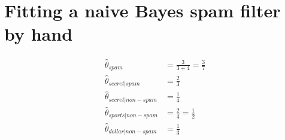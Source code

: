 \documentclass{article}
\begin{document}
\section{Fitting a naive Bayes spam filter by hand}

\begin{align*}
  \hat{\theta}_{spam} &= \frac{3}{3 + 4} = \frac{3}{7} \\
  \hat{\theta}_{secret|spam} &= \frac{2}{3} \\
  \hat{\theta}_{secret|non-spam} &= \frac{1}{4} \\
  \hat{\theta}_{sports|non-spam} &= \frac{2}{4} = \frac{1}{2} \\
  \hat{\theta}_{dollar|non-spam} &= \frac{1}{3} \\
\end{align*}
\end{document}
